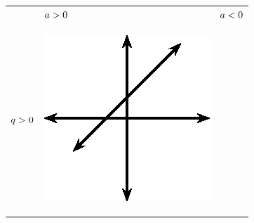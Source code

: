      \begin{table}[H]  %
        \begin{center}
      \label{m39338*uid82}
    \noindent
      \tablelasttail{}
      \begin{xtabular*}{\mytablewidth}[t]{|p{10\mystarwidth}|p{10\mystarwidth}|p{10\mystarwidth}|}\hline
         &
                  $a>{}0$
                 &
                  $a<{}0$
     \tabularnewline{}
                  $q>{}0$
                 &
    \setcounter{subfigure}{0}
\label{m39338*id238303}
    \begin{center}
    \label{m39338*id238303!!!underscore!!!media}\label{m39338*id238303!!!underscore!!!printimage}\includegraphics[width=.3\columnwidth]{col11306.imgs/m39338_MG10C11_006.png} %
      \vspace{2pt}

\end{center}
\end{xtabular*}
\end{center}
\end{table}
